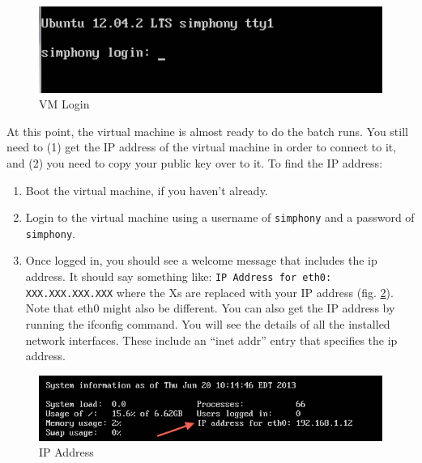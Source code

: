 \documentclass[11pt]{amsart}
\begin{document}
\begin{figure}[h]
\begin{center}
\vspace{.2in}
\centerline {
\includegraphics[width=4.5in]{images/vm_login.png}
}
\caption{VM Login}
\label{fig:vm_login}
\end{center}
\end{figure}

At this point, the virtual machine is almost ready to do the batch runs. You still need to (1) get the IP address of the virtual machine in order to connect to it, and (2) you need to copy your public key over to it. To find the IP address:

\begin{enumerate}
\item Boot the virtual machine, if you haven't already.
\item Login to the virtual machine using a username of {\tt simphony} and a password of {\tt simphony}.
\item Once logged in, you should see a welcome message that includes the ip address. It should say something like: {\tt IP Address for eth0: XXX.XXX.XXX.XXX} where the Xs are replaced with your IP address (fig. \ref{fig:ip}). Note that eth0 might also be different. You can also get the IP address by running the ifconfig command. You will see the details of all the installed network interfaces. These include an ``inet addr'' entry that specifies the ip address.
\end{enumerate}

\begin{figure}[h]
\begin{center}
\vspace{.2in}
\centerline {
\includegraphics[width=5in]{images/ip.png}
}
\caption{IP Address}
\label{fig:ip}
\end{center}
\end{figure}
\end{document}
